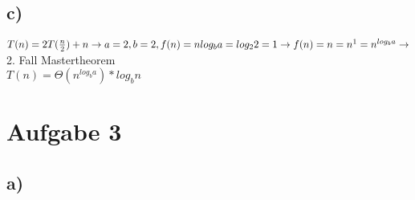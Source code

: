 \documentclass[a4paper]{scrartcl}
\begin{document}
 \subsection*{c)}
$T(n)=2T(\frac{n}{2})+n\\
 \rightarrow a=2, b=2, f(n)=n\\
 log_b a = log_2 2=1\\
 \rightarrow f(n)=n = n^1=n^{log_ba} \rightarrow$ 2. Fall Mastertheorem\\
 $T(n)=\Theta(n^{log_ba})*log_bn$

\section*{Aufgabe 3}

\subsection*{a)}
\end{document}
